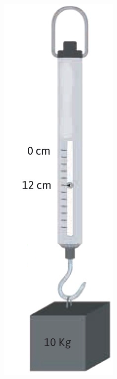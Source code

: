 \documentclass[11pt]{book}
\begin{document}
\begin{enumerate}
\begin{minipage}[t]{0.15\linewidth}
\begin{figure}[H]
            \includegraphics[width=\linewidth]{dinamometro}

\end{figure}
\end{minipage}
\end{enumerate}
\end{document}
